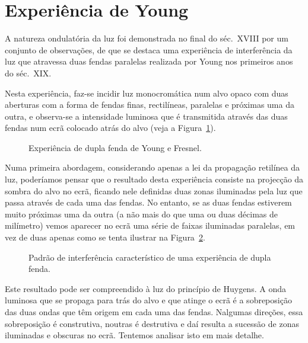 \section{Experiência de Young}
A natureza ondulatória da luz foi demonstrada no final do séc.~XVIII por um
conjunto de observações, de que se destaca uma experiência de interferência da
luz que atravessa duas fendas paralelas realizada por Young nos primeiros anos
do séc.~XIX.

Nesta experiência, faz-se incidir luz monocromática num alvo opaco com duas
aberturas com a forma de fendas finas, rectilíneas, paralelas e próximas uma da
outra, e observa-se a intensidade luminosa que é transmitida através das duas
fendas num ecrã colocado atrás do alvo (veja a Figura~\ref{fig:oof050}).
\begin{figure}[htb]
{\centering
\caption{Experiência de dupla fenda de Young e Fresnel.\label{fig:oof050}}

}
\end{figure}
Numa primeira abordagem, considerando apenas a lei da propagação retilínea da
luz, poderíamos pensar que o resultado desta experiência consiste na projecção
da sombra do alvo no ecrã, ficando nele definidas duas zonas iluminadas pela luz
que passa através de cada uma das fendas. No entanto, se as duas fendas
estiverem muito próximas uma da outra (a não mais do que uma ou duas décimas de
milímetro) vemos aparecer no ecrã uma série de faixas iluminadas paralelas, em
vez de duas apenas como se tenta ilustrar na Figura~\ref{fig:oof060}.
\begin{figure}[htb]
    {\centering
        \caption{Padrão de interferência característico de uma experiência de
            dupla fenda.\label{fig:oof060}}

    }
\end{figure}
Este resultado pode ser compreendido à luz do princípio de Huygens. A onda
luminosa que se propaga para trás do alvo e que atinge o ecrã é a sobreposição
das duas ondas que têm origem em cada uma das fendas. Nalgumas direções, essa
sobreposição é construtiva, noutras é destrutiva e daí resulta a sucessão de
zonas iluminadas e obscuras no ecrã. Tentemos analisar isto em mais detalhe.

